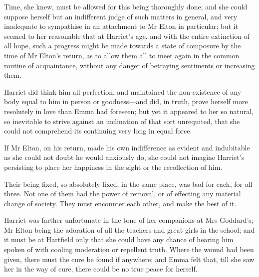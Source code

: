 Time, she knew, must be allowed for this being thoroughly done; and she could suppose herself but an indifferent judge of such matters in general, and very inadequate to sympathise in an attachment to Mr Elton in particular; but it seemed to her reasonable that at Harriet's age, and with the entire extinction of all hope, such a progress might be made towards a state of composure by the time of Mr Elton's return, as to allow them all to meet again in the common routine of acquaintance, without any danger of betraying sentiments or increasing them.

Harriet did think him all perfection, and maintained the non-existence of any body equal to him in person or goodness—and did, in truth, prove herself more resolutely in love than Emma had foreseen; but yet it appeared to her so natural, so inevitable to strive against an inclination of that sort unrequited, that she could not comprehend its continuing very long in equal force.

If Mr Elton, on his return, made his own indifference as evident and indubitable as she could not doubt he would anxiously do, she could not imagine Harriet's persisting to place her happiness in the sight or the recollection of him.

Their being fixed, so absolutely fixed, in the same place, was bad for each, for all three. Not one of them had the power of removal, or of effecting any material change of society. They must encounter each other, and make the best of it.

Harriet was farther unfortunate in the tone of her companions at Mrs Goddard's; Mr Elton being the adoration of all the teachers and great girls in the school; and it must be at Hartfield only that she could have any chance of hearing him spoken of with cooling moderation or repellent truth. Where the wound had been given, there must the cure be found if anywhere; and Emma felt that, till she saw her in the way of cure, there could be no true peace for herself.